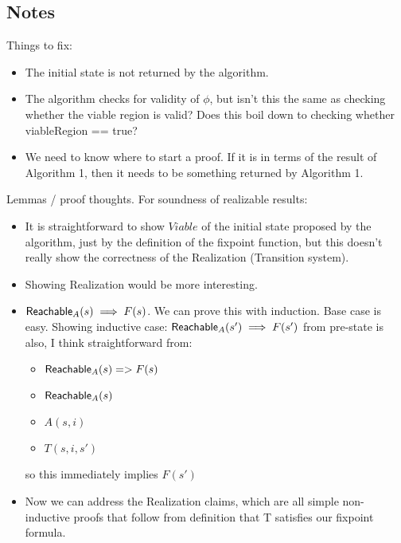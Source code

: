\subsection{Notes}

Things to fix:
\begin{itemize}
\item The initial state is not returned by the algorithm.
\item The algorithm checks for validity of $\phi$, but isn't this the same as checking whether the viable region is valid?  Does this boil down to checking whether viableRegion == true?
\item We need to know where to start a proof.  If it is in terms of the result of Algorithm 1, then it needs to be something returned by Algorithm 1.
\end{itemize}


Lemmas / proof thoughts.  For soundness of realizable results:
\begin{itemize}
    \item It is straightforward to show $Viable$ of the initial state proposed by
        the algorithm, just by the definition of the fixpoint function, but this doesn't really show the correctness of the Realization (Transition system).
    \item Showing Realization would be more interesting.
    \item ${\mathsf {Reachable}}_{A}(s) \implies F(s)$.  We can prove this with induction.  Base case is easy. Showing inductive case: ${\mathsf {Reachable}}_{A}(s') \implies F(s')$ from pre-state is also, I think straightforward from:
        \begin{itemize}
            \item ${\mathsf {Reachable}}_{A}(s) => F(s)$
            \item ${\mathsf {Reachable}}_{A}(s)$
            \item $A(s, i)$
            \item $T(s, i, s')$
        \end{itemize}
        so this immediately implies $F(s')$
    \item Now we can address the Realization claims, which are all simple non-inductive proofs that follow from definition that T satisfies our fixpoint formula.
\end{itemize}

